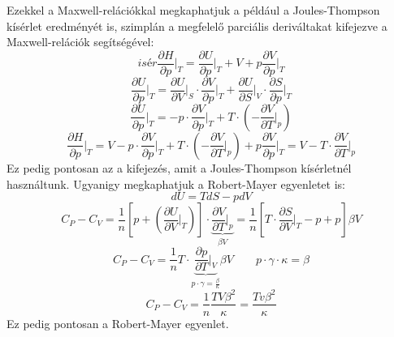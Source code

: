 \documentclass[a4paper,12pt]{article}
\begin{document}
Ezekkel a Maxwell-relációkkal megkaphatjuk a például a Joules-Thompson kísérlet eredményét is, szimplán a megfelelő parciális deriváltakat kifejezve a Maxwell-relációk segítségével:
\begin{equation}isér
    \frac{\partial H}{\partial p}\bigg|_{T} = \frac{\partial U}{\partial p}\bigg|_{T} + V + p \frac{\partial V}{\partial p}\bigg|_{T} 
\end{equation}
\begin{equation}
    \frac{\partial U}{\partial p}\bigg|_{T} = \frac{\partial U}{\partial V}\bigg|_{S} \cdot \frac{\partial V}{\partial p}\bigg|_{T} + \frac{\partial U}{\partial S}\bigg|_{V} \cdot \frac{\partial S}{\partial p}\bigg|_{T}
\end{equation}
\begin{equation}
    \frac{\partial U}{\partial p}\bigg|_{T} = -p \cdot \frac{\partial V}{\partial p}\bigg|_{T} + T \cdot \left(- \frac{\partial V}{\partial T}\bigg|_{p}\right)
\end{equation}
\begin{equation}
    \frac{\partial H}{\partial p}\bigg|_{T} = V - p \cdot \frac{\partial V}{\partial p}\bigg|_{T} + T \cdot \left(- \frac{\partial V}{\partial T}\big|_{p}\right) + p \frac{\partial V}{\partial p}\bigg|_{T} = V - T \cdot \frac{\partial V}{\partial T}\bigg|_{p}
\end{equation}
Ez pedig pontosan az a kifejezés, amit a Joules-Thompson kísérletnél használtunk.
\newline
\newline
Ugyanigy megkaphatjuk a Robert-Mayer egyenletet is:
\begin{equation}
    dU = TdS -pdV
\end{equation}
\begin{equation}
    C_P - C_V = \frac{1}{n} \left[p + \left(\frac{\partial U}{\partial V}\bigg|_{T}\right)\right] \cdot \underbrace{\frac{\partial V}{\partial T}\bigg|_{p}}_{\beta V} = \frac{1}{n} \left[T \cdot \frac{\partial S}{\partial V}\bigg|_{T}-p+p \right] \beta V
\end{equation}
\begin{equation}
    C_P - C_V = \frac{1}{n} T \cdot \underbrace{\frac{\partial p}{\partial T}\bigg|_{V}}_{p \cdot \gamma = \frac{\beta}{\kappa}} \beta V \qquad p \cdot \gamma \cdot \kappa = \beta
\end{equation}
\begin{equation}
    C_P - C_V = \frac{1}{n} \frac{TV\beta^2}{\kappa} = \frac{Tv\beta^2}{\kappa}
\end{equation}
Ez pedig pontosan a Robert-Mayer egyenlet.
\end{document}
